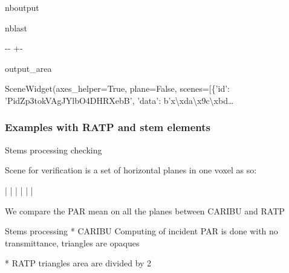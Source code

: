 \documentclass[letterpaper,10pt,english]{sphinxmanual}
\begin{document}
\begin{sphinxuseclass}{nboutput}
\begin{sphinxuseclass}{nblast}
{

\kern-\sphinxverbatimsmallskipamount\kern-\baselineskip
\kern+\FrameHeightAdjust\kern-\fboxrule
\vspace{\nbsphinxcodecellspacing}

\begin{sphinxuseclass}{output_area}
\begin{sphinxuseclass}{}


\begin{sphinxVerbatim}[commandchars=\\\{\}]
\llap{\color{nbsphinxout}[10]:\,\hspace{\fboxrule}\hspace{\fboxsep}}SceneWidget(axes\_helper=True, plane=False, scenes=[\{'id': 'PidZp3tokVAgJYlbO4DHRXebB', 'data': b'x\textbackslash{}xda\textbackslash{}x9c\textbackslash{}xbd…
\end{sphinxVerbatim}



\end{sphinxuseclass}
\end{sphinxuseclass}
}

\end{sphinxuseclass}
\end{sphinxuseclass}

\subsubsection{Examples with RATP and stem elements}
\label{\detokenize{more_examples:Examples-with-RATP-and-stem-elements}}
\begin{sphinxVerbatim}[commandchars=\\\{\}]
Stems processing checking
\PYGZhy{}\PYGZhy{}\PYGZhy{}\PYGZhy{}\PYGZhy{}\PYGZhy{}\PYGZhy{}\PYGZhy{}\PYGZhy{}\PYGZhy{}\PYGZhy{}\PYGZhy{}\PYGZhy{}\PYGZhy{}\PYGZhy{}\PYGZhy{}\PYGZhy{}\PYGZhy{}\PYGZhy{}\PYGZhy{}\PYGZhy{}\PYGZhy{}\PYGZhy{}\PYGZhy{}\PYGZhy{}

Scene for verification is a set of horizontal planes in one voxel as so:

\PYGZhy{}\PYGZhy{}\PYGZhy{}\PYGZhy{}\PYGZhy{}\PYGZhy{}\PYGZhy{}\PYGZhy{}\PYGZhy{}\PYGZhy{}\PYGZhy{}\PYGZhy{}\PYGZhy{}
|   \PYGZhy{}\PYGZhy{}\PYGZhy{}\PYGZhy{}    |
|     \PYGZus{}\PYGZus{}\PYGZus{}\PYGZus{}  |
| \PYGZhy{}\PYGZhy{}\PYGZhy{}\PYGZhy{}      |
\PYGZhy{}\PYGZhy{}\PYGZhy{}\PYGZhy{}\PYGZhy{}\PYGZhy{}\PYGZhy{}\PYGZhy{}\PYGZhy{}\PYGZhy{}\PYGZhy{}\PYGZhy{}\PYGZhy{}

We compare the PAR mean on all the planes between CARIBU and RATP

Stems processing
    * CARIBU
        Computing of incident PAR is done with no transmittance, triangles are opaques

    * RATP
        triangles area are divided by 2
\end{sphinxVerbatim}
\end{document}
